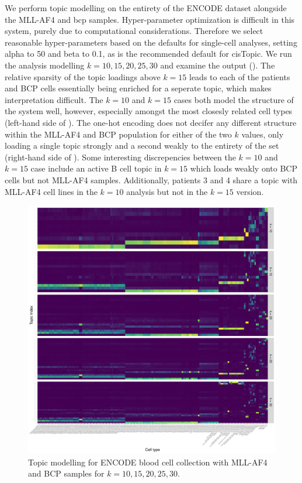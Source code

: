 We perform topic modelling on the entirety of the ENCODE dataset alongside the MLL-AF4 and \gls{bcp} samples. Hyper-parameter optimization is difficult in this system, purely due to computational considerations. Therefore we select reasonable hyper-parameters based on the defaults for single-cell analyses, setting alpha to 50 and beta to 0.1, as is the recommended default for cisTopic. We run the analysis modelling $k=10,15,20,25,30$ and examine the output (). The relative sparsity of the topic loadings above $k=15$ leads to each of the patients and BCP cells essentially being enriched for a seperate topic, which makes interpretation difficult. The $k=10$ and $k=15$ cases both model the structure of the system well, however, especially amongst the most closesly related cell types (left-hand side of ). The one-hot encoding does not decifer any different structure within the MLL-AF4 and BCP population for either of the two $k$ values, only loading a single topic strongly and a second weakly to the entirety of the set (right-hand side of ). Some interesting discrepencies between the $k=10$ and $k=15$ case include an active B cell topic in $k=15$ which loads weakly onto BCP cells but not MLL-AF4 samples. Additionally, patients 3 and 4 share a topic with MLL-AF4 cell lines in the $k=10$ analysis but not in the $k=15$ version.  


\begin{figure}
    \centering
    \includegraphics[width=\textwidth]{plot/ch5/mll_encode_all_topics.pdf}
    \caption{Topic modelling for ENCODE blood cell collection with MLL-AF4 and BCP samples for $k=10,15,20,25,30$. }
    \label{fig:encode_all}
\end{figure}

